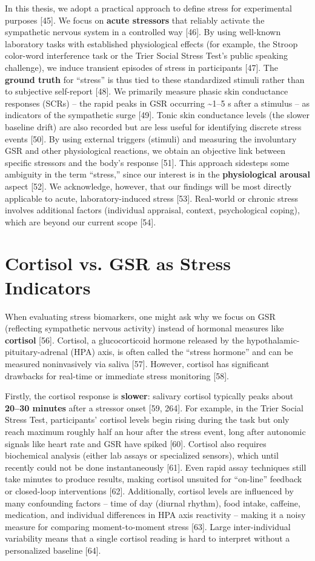 \documentclass{article}
\begin{document}
    In this thesis, we adopt a practical approach to define stress for experimental purposes [45]. We focus on \textbf{acute stressors} that reliably activate the sympathetic nervous system in a controlled way [46]. By using well-known laboratory tasks with established physiological effects (for example, the Stroop color-word interference task or the Trier Social Stress Test’s public speaking challenge), we induce transient episodes of stress in participants [47]. The \textbf{ground truth} for “stress” is thus tied to these standardized stimuli rather than to subjective self-report [48]. We primarily measure phasic skin conductance responses (SCRs) – the rapid peaks in GSR occurring \textasciitilde1–5 s after a stimulus – as indicators of the sympathetic surge [49]. Tonic skin conductance levels (the slower baseline drift) are also recorded but are less useful for identifying discrete stress events [50]. By using external triggers (stimuli) and measuring the involuntary GSR and other physiological reactions, we obtain an objective link between specific stressors and the body’s response [51]. This approach sidesteps some ambiguity in the term “stress,” since our interest is in the \textbf{physiological arousal} aspect [52]. We acknowledge, however, that our findings will be most directly applicable to acute, laboratory-induced stress [53]. Real-world or chronic stress involves additional factors (individual appraisal, context, psychological coping), which are beyond our current scope [54].

    \section{Cortisol vs. GSR as Stress Indicators}
    When evaluating stress biomarkers, one might ask why we focus on GSR (reflecting sympathetic nervous activity) instead of hormonal measures like \textbf{cortisol} [56]. Cortisol, a glucocorticoid hormone released by the hypothalamic-pituitary-adrenal (HPA) axis, is often called the “stress hormone” and can be measured noninvasively via saliva [57]. However, cortisol has significant drawbacks for real-time or immediate stress monitoring [58].

    Firstly, the cortisol response is \textbf{slower}: salivary cortisol typically peaks about \textbf{20–30 minutes} after a stressor onset [59, 264]. For example, in the Trier Social Stress Test, participants’ cortisol levels begin rising during the task but only reach maximum roughly half an hour after the stress event, long after autonomic signals like heart rate and GSR have spiked [60]. Cortisol also requires biochemical analysis (either lab assays or specialized sensors), which until recently could not be done instantaneously [61]. Even rapid assay techniques still take minutes to produce results, making cortisol unsuited for “on-line” feedback or closed-loop interventions [62]. Additionally, cortisol levels are influenced by many confounding factors – time of day (diurnal rhythm), food intake, caffeine, medication, and individual differences in HPA axis reactivity – making it a noisy measure for comparing moment-to-moment stress [63]. Large inter-individual variability means that a single cortisol reading is hard to interpret without a personalized baseline [64].
\end{document}
